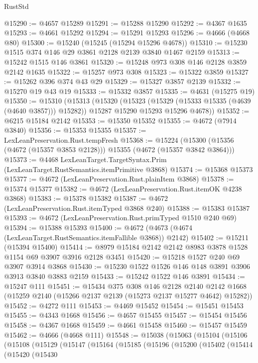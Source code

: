 \begin{lexlean}{RustStd}
\begin{coremodule}
{\begin{coremodule}
{{{{{{{{{{{{{{{{@15290 := @4657 @15289
@15291 := @15288 @15290
@15292 := @4367 @1635
@15293 := @4661 @15292
@15294 := @15291 @15293
@15296 := @4666 (@4668 @80)
@15300 := @15240 (@15245 (@15294 @15296 @4678))
@15310 := @15230 @1515 @374 @146 @29 @3861 @2128 @2139 @3840 @1467 @2159
@15313 := @15242 @1515 @146 @3861
@15320 := @15248 @973 @308 @146 @2128 @3859 @2142 @1635
@15322 := @15257 @973 @308
@15323 := @15322 @3859
@15327 := @15262 @396 @374 @43 @29
@15329 := @15327 @3857 @2139
@15332 := @15270 @19 @43 @19
@15333 := @15332 @3857
@15335 := @4631 (@15275 @19)
@15350 := @15310
    (@15313
      (@15320
        (@15323 (@15329 (@15333 @15335 (@4639 (@4640 @3857))) @15282))
        @15287
        @15290
        @15293
        @15296
        @4678))
@15352 := @6215 @15184 @2142
@15353 := @15350 @15352
@15355 := @4672 (@7914 @3840)
@15356 := @15353 @15355
@15357 := LexLeanPreservation.Rust.tempFresh
@15368 := @15224 (@15300 (@15356 (@4672 (@15357 @3853 @2128))) @15355 (@4672 (@15357 @3842 @3864)))
@15373 := @4468 LexLeanTarget.TargetSyntax.Prim (LexLeanTarget.RustSemantics.itemPrimitive @3868)
@15374 := @15368 @15373
@15377 := @4672 (LexLeanPreservation.Rust.plainItem @3868)
@15378 := @15374 @15377
@15382 := @4672 (LexLeanPreservation.Rust.itemOK @4238 @3868)
@15383 := @15378 @15382
@15387 := @4672 (LexLeanPreservation.Rust.itemTyped @3868 @240)
@15388 := @15383 @15387
@15393 := @4672 (LexLeanPreservation.Rust.primTyped @1510 @240 @69)
@15394 := @15388 @15393
@15400 := @4672 (@4673 (@4674 (LexLeanTarget.RustSemantics.itemFallible @3868)) @2142)
@15402 := @15211 (@15394 @15400)
@15414 := @8979 @15184 @2142 @2142 @8983 @3878 @1528 @1154 @69 @3907 @3916 @2128 @3451
@15420 := @15218 @1527 @240 @69 @3907 @3914 @3868
@15430 := @15230 @1522 @1526 @146 @148 @3891 @3906 @3913 @3840 @3883 @2159
@15433 := @15242 @1522 @146 @3891
@15434 := @15247 @111
@15451 := @15434
    @375
    @308
    @146
    @2128
    @2140
    @2142
    @1668
    (@15259 @2140 (@15266 @2137 @2139 (@15273 @2137 @15277 @4642) @15282))
@15452 := @4272 @111
@15453 := @4469 @15452
@15454 := @15451 @15453
@15455 := @4343 @1668
@15456 := @4657 @15455
@15457 := @15454 @15456
@15458 := @4367 @1668
@15459 := @4661 @15458
@15460 := @15457 @15459
@15462 := @4666 (@4668 @111)
@15548 := @15038
    (@15063
      (@15104
        (@15106
          (@15108
            (@15129
              (@15147
                (@15164
                  (@15185
                    (@15196
                      (@15200
                        (@15402
                          (@15414
                            (@15420
                              (@15430
}}}}}}}}}}}}}}}}
\end{coremodule}}
\end{coremodule}
\end{lexlean}

